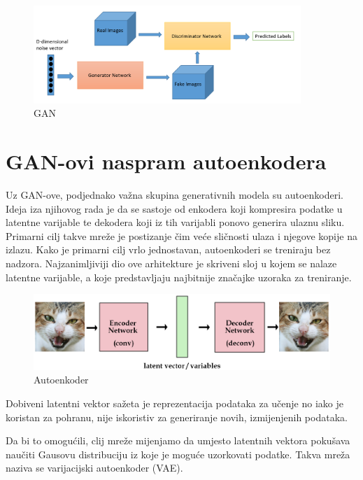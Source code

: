 \documentclass[lmodern, utf8, seminar]{fer}
\begin{document}
\begin{figure}[H]
    \centering
    \includegraphics[width=0.9\textwidth]{gan_schema}
    \caption{GAN \cite{goodfellow2016nips}}
    \label{fig:gan_schema}
\end{figure}

\newpage
\section{GAN-ovi naspram autoenkodera}
Uz GAN-ove, podjednako važna skupina generativnih modela su autoenkoderi. Ideja iza njihovog rada je da se sastoje od enkodera koji kompresira podatke u latentne varijable te dekodera koji iz tih varijabli ponovo generira ulaznu sliku. Primarni cilj takve mreže je postizanje čim veće sličnosti ulaza i njegove kopije na izlazu. Kako je primarni cilj vrlo jednostavan, autoenkoderi se treniraju bez nadzora.
Najzanimljiviji dio ove arhitekture je skriveni sloj u kojem se nalaze latentne varijable, a koje predstavljaju najbitnije značajke uzoraka za treniranje.
\newline

\begin{figure}[H]
    \centering
    \includegraphics[width=1\textwidth]{autoenc}
    \caption{Autoenkoder \cite{website:kvfrans}}
    \label{fig:autoenc}
\end{figure}

Dobiveni latentni vektor sažeta je reprezentacija podataka za učenje no iako je koristan za pohranu, nije iskoristiv za generiranje novih, izmijenjenih podataka. 

Da bi to omogućili, clij mreže mijenjamo da umjesto latentnih vektora pokušava naučiti Gausovu distribuciju iz koje je moguće uzorkovati podatke. Takva mreža naziva se varijacijski autoenkoder (VAE).
\end{document}

